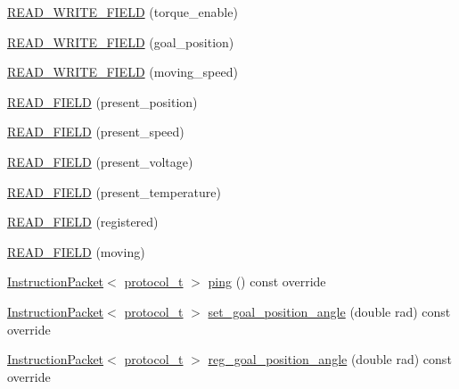 \begin{DoxyCompactItemize}
\item 
\hyperlink{classdynamixel_1_1servos_1_1_servo_a38f0ba19d8706cdffe1931fd0b803360}{R\+E\+A\+D\+\_\+\+W\+R\+I\+T\+E\+\_\+\+F\+I\+E\+L\+D} (torque\+\_\+enable)
\item 
\hyperlink{classdynamixel_1_1servos_1_1_servo_a62e1e0a0ba01efa5d5d7f4d310a70792}{R\+E\+A\+D\+\_\+\+W\+R\+I\+T\+E\+\_\+\+F\+I\+E\+L\+D} (goal\+\_\+position)
\item 
\hyperlink{classdynamixel_1_1servos_1_1_servo_a3928c0f3a88838a01c6cdc1747b362a0}{R\+E\+A\+D\+\_\+\+W\+R\+I\+T\+E\+\_\+\+F\+I\+E\+L\+D} (moving\+\_\+speed)
\item 
\hyperlink{classdynamixel_1_1servos_1_1_servo_af5e933f746897f67e33f7efee3b58fca}{R\+E\+A\+D\+\_\+\+F\+I\+E\+L\+D} (present\+\_\+position)
\item 
\hyperlink{classdynamixel_1_1servos_1_1_servo_a01a3cc7e52aba7cf772434d3642c06e3}{R\+E\+A\+D\+\_\+\+F\+I\+E\+L\+D} (present\+\_\+speed)
\item 
\hyperlink{classdynamixel_1_1servos_1_1_servo_a3b7845daafbf75fdfcf3d26d9bcc0dbf}{R\+E\+A\+D\+\_\+\+F\+I\+E\+L\+D} (present\+\_\+voltage)
\item 
\hyperlink{classdynamixel_1_1servos_1_1_servo_a0d3fbe926d5c4403f3b9f06d596daeb2}{R\+E\+A\+D\+\_\+\+F\+I\+E\+L\+D} (present\+\_\+temperature)
\item 
\hyperlink{classdynamixel_1_1servos_1_1_servo_a615444eaaddfc69de68bf2e65c0751e8}{R\+E\+A\+D\+\_\+\+F\+I\+E\+L\+D} (registered)
\item 
\hyperlink{classdynamixel_1_1servos_1_1_servo_a891d5b76b43a6743090fae54261214ce}{R\+E\+A\+D\+\_\+\+F\+I\+E\+L\+D} (moving)
\item 
\hyperlink{classdynamixel_1_1_instruction_packet}{Instruction\+Packet}$<$ \hyperlink{classdynamixel_1_1servos_1_1_servo_a7718c41cee1187b992836f4b6bad8a38}{protocol\+\_\+t} $>$ \hyperlink{classdynamixel_1_1servos_1_1_servo_a9a471486d0ec100d485c5fb4af114d38}{ping} () const override
\item 
\hyperlink{classdynamixel_1_1_instruction_packet}{Instruction\+Packet}$<$ \hyperlink{classdynamixel_1_1servos_1_1_servo_a7718c41cee1187b992836f4b6bad8a38}{protocol\+\_\+t} $>$ \hyperlink{classdynamixel_1_1servos_1_1_servo_a02827789424669a3e34d5e87b7446bdd}{set\+\_\+goal\+\_\+position\+\_\+angle} (double rad) const override
\item 
\hyperlink{classdynamixel_1_1_instruction_packet}{Instruction\+Packet}$<$ \hyperlink{classdynamixel_1_1servos_1_1_servo_a7718c41cee1187b992836f4b6bad8a38}{protocol\+\_\+t} $>$ \hyperlink{classdynamixel_1_1servos_1_1_servo_ac435a6f8e971bd1db3d7456edb97cf03}{reg\+\_\+goal\+\_\+position\+\_\+angle} (double rad) const override

\end{DoxyCompactItemize}
